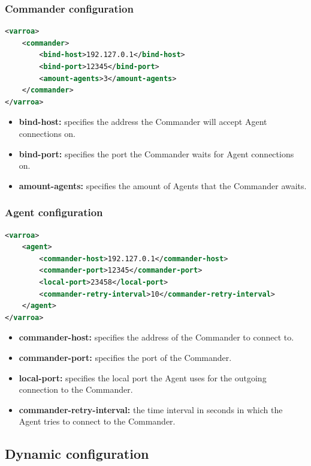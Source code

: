 \subsubsection{Commander configuration}\label{sec:commanderConfig}
\begin{lstlisting}[caption={Commander XML configuration example}, captionpos=b, label={lst:commanderConfig}, language=XML]
<varroa>
    <commander>
		<bind-host>192.127.0.1</bind-host>
        <bind-port>12345</bind-port>
        <amount-agents>3</amount-agents>
    </commander>
</varroa>
\end{lstlisting}
\begin{itemize}
	\item \textbf{bind-host:} specifies the address the Commander will accept Agent connections on.
	\item \textbf{bind-port:} specifies the port the Commander waits for Agent connections on.
	\item \textbf{amount-agents:} specifies the amount of Agents that the Commander awaits.
\end{itemize}

\subsubsection{Agent configuration}\label{sec:agentConfig}
\begin{lstlisting}[caption={Agent XML configuration example}, captionpos=b, label={lst:agentConfig}, language=XML]
<varroa>
    <agent>
		<commander-host>192.127.0.1</commander-host>
        <commander-port>12345</commander-port>
        <local-port>23458</local-port>
		<commander-retry-interval>10</commander-retry-interval>
    </agent>
</varroa>
\end{lstlisting}
\begin{itemize}
	\item \textbf{commander-host:} specifies the address of the Commander to connect to.
	\item \textbf{commander-port:} specifies the port of the Commander.
	\item \textbf{local-port:} specifies the local port the Agent uses for the outgoing connection to the Commander.
	\item \textbf{commander-retry-interval:} the time interval in seconds in which the Agent tries to connect to the Commander.
\end{itemize}

\subsection{Dynamic configuration}

